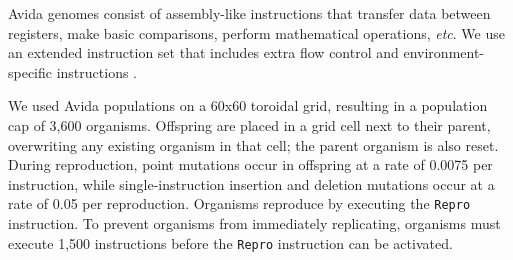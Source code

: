 


Avida genomes consist of assembly-like instructions that transfer data between registers, make basic comparisons, perform mathematical operations, \textit{etc}.
We use an extended instruction set that includes extra flow control and environment-specific instructions \citep{fergusonFergusonAJReplayingEvolution2023}.

We used Avida populations on a 60x60 toroidal grid, resulting in a population cap of 3,600 organisms.
Offspring are placed in a grid cell next to their parent, overwriting any existing organism in that cell; the parent organism is also reset. %
During reproduction, point mutations occur in offspring at a rate of 0.0075 per instruction, while single-instruction insertion and deletion mutations occur at a rate of 0.05 per reproduction.
Organisms reproduce by %
executing the \texttt{Repro} instruction.
To prevent organisms from immediately replicating, %
organisms must execute 1,500 instructions before the \texttt{Repro} instruction can be activated.  


